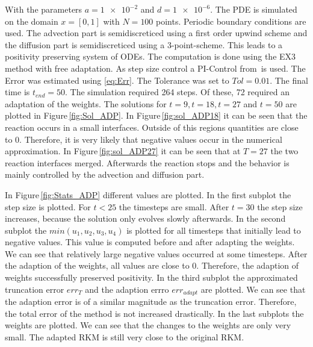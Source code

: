 \documentclass[a4paper]{article}
\numberwithin{equation}{section}
\theoremstyle{plain}
\theoremstyle{definition}
\numberwithin{theorem}{section}
\newcommand{\1}{\mathbbm{1}}
\begin{document}
With the parameters $a=\num{1e-2} $ and $ d=\num{1e-6}$. 
The PDE is simulated on the domain $x = [0,1]$ with $N=100$ points. Periodic boundary conditions are used. 
The advection part is semidiscreticed using a first order upwind scheme and the diffusion part is semidiscreticed using a 3-point-scheme. This leads to a positivity preserving system of ODEs.  
The computation is done using the EX3 method with free adaptation. 
As step size control a PI-Control from\,\cite{hairer_solving_1996} is used. The Error was estimated using \eqref{eq:Err}. The Tolerance was set to $Tol = 0.01$.  
The final time is $t_{end} = 50$. 
The simulation required 264 steps. Of these, 72 required an adaptation of the weights. 
The solutions for $t=9,t=18,t=27$ and $t=50$ are plotted in Figure\,\ref{fig:Sol_ADP}. 
In Figure\,\ref{fig:sol_ADP18} it can be seen that the reaction occurs in a small interfaces. 
Outside of this regions quantities are close to $0$. Therefore, it is very likely that negative values occur in the numerical approximation. 
In Figure\,\ref{fig:sol_ADP27} it can be seen that at $T=27$ the two reaction interfaces merged. Afterwards the reaction stops and the behavior is mainly controlled by the advection and diffusion part.  

In Figure\,\ref{fig:Stats_ADP} different values are plotted.  
In the first subplot the step size is plotted. For $t<25$ the timesteps are small. After $t = 30$ the step size increases, because the solution only evolves slowly afterwards. 
In the second subplot the $min(u_1,u_2,u_3,u_4)$ is plotted for all timesteps that initially lead to negative values. This value is computed before and after adapting the weights.  
We can see that relatively large negative values occurred at some timesteps. 
After the adaption of the weights, all values are close to $0$. Therefore, the adaption of weights successfully preserved positivity. 
In the third subplot the approximated truncation error $err_T$ and the adaption errro $err_{adapt}$ are plotted. 
We can see that the adaption error is of a similar magnitude as the truncation error. Therefore, the total error of the method is not increased drastically.  
In the last subplots the weights are plotted.  
We can see that the changes to the weights are only very small. The adapted RKM is still very close to the original RKM. 
\end{document}
